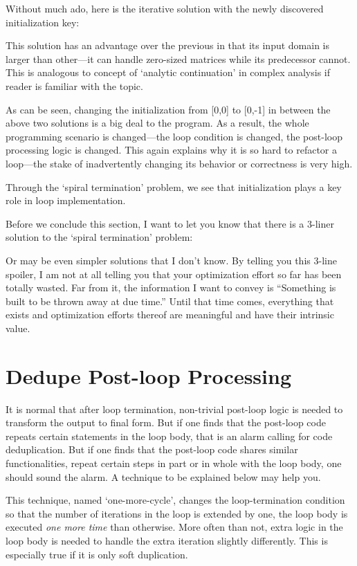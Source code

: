 \documentclass[oneside,11pt]{book}
\theoremstyle{definition}
\theoremstyle{remark}
\begin{document}
Without much ado, here is the iterative solution with the newly discovered initialization key:

This solution has an advantage over the previous in that
its input domain is larger than other---it can handle zero-sized matrices while its predecessor
cannot.
This is analogous to concept of `analytic continuation' in complex analysis if
reader is familiar with the topic.


As can be seen, changing the initialization from [0,0] to [0,-1] in between the above two solutions
is a big deal to the program.
As a result, the whole programming scenario is changed---the loop condition is changed,
the post-loop processing logic is changed.
This again explains why it is so hard to refactor a loop---the stake of inadvertently changing
its behavior or correctness is very high.


Through the `spiral termination' problem, we see that initialization plays a key role in loop
implementation.


Before we conclude this section, I want to let you know that there is a 3-liner solution to the
`spiral termination' problem:

Or may be even simpler solutions that I don't know.
By telling you this 3-line spoiler, I am not at all telling you that your
optimization effort so far has been totally wasted.
Far from it, the information I want to convey is ``Something is built to be thrown away
at due time.''
Until that time comes, everything that exists and optimization efforts thereof are
meaningful and have their intrinsic value.


\section{Dedupe Post-loop Processing}\label{sec:one-more-cycle}

It is normal that after loop termination, non-trivial post-loop logic is needed to
transform the output to final form.
But if one finds that the post-loop code repeats certain statements in the loop body,
that is an alarm calling for code deduplication.
But if one finds that the post-loop code shares similar functionalities,
repeat certain steps in part or in whole with the loop body, one should sound the alarm.
A technique to be explained below may help you.


This technique, named `one-more-cycle', changes the loop-termination condition so that
the number of iterations in the loop is extended by one, the loop body is executed \emph{one more time}
than otherwise.
More often than not, extra logic in the loop body is needed to handle the extra iteration
slightly differently.
This is especially true if it is only soft duplication.
\end{document}

